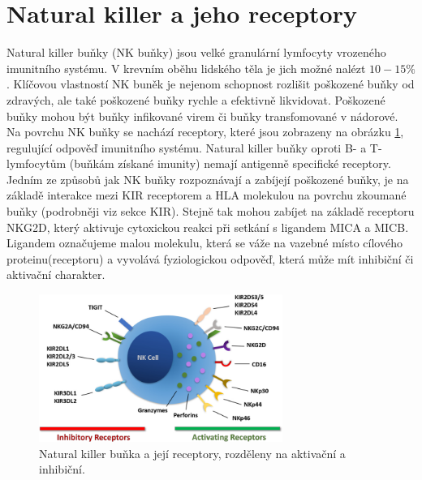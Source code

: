 \documentclass[czech,DP]{thesiskiv}
\numberwithin{equation}{section}
\begin{document}
\section{Natural killer a jeho receptory}
Natural killer buňky (NK buňky) jsou velké granulární lymfocyty vrozeného imunitního systému. V krevním oběhu lidského těla je jich možné nalézt $10-15 \%$. Klíčovou vlastností NK buněk je nejenom schopnost rozlišit poškozené buňky od zdravých, ale také poškozené buňky rychle a efektivně likvidovat. Poškozené buňky mohou být buňky infikované virem či buňky transfomované v nádorové. Na povrchu NK buňky se nachází receptory, které jsou zobrazeny na obrázku \ref{fig:NK_receptors}, regulující odpověď imunitního systému. Natural killer buňky oproti B- a T- lymfocytům (buňkám získané imunity) nemají antigenně specifické receptory. Jedním ze způsobů jak NK buňky rozpoznávají a zabíjejí poškozené buňky, je na základě interakce mezi KIR receptorem a HLA molekulou na povrchu zkoumané buňky (podrobněji viz sekce KIR). Stejně tak mohou zabíjet na základě receptoru NKG2D, který aktivuje cytoxickou reakci při setkání s ligandem MICA a MICB. Ligandem označujeme malou molekulu, která se váže na vazebné místo cílového proteinu(receptoru) a vyvolává fyziologickou odpověď, která může mít inhibiční či aktivační charakter. 
\begin{figure}[H]		
		\centering
		\includegraphics[width=300px]{./img/nk_receptory.jpg}
		\caption{Natural killer buňka a její receptory, rozděleny na aktivační a inhibiční.\cite{NK_receptors} }
		\label{fig:NK_receptors}
\end{figure}
\end{document}
